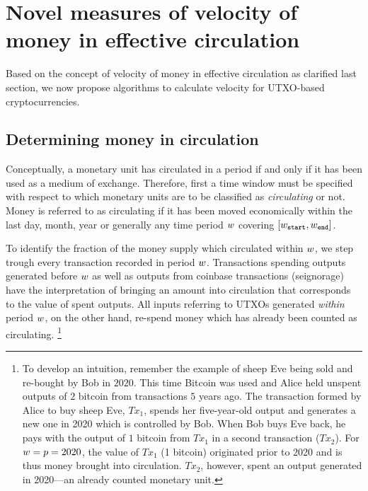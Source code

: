 
\section{Novel measures of velocity of money in effective circulation}
\label{sec:cc_money_seg}%

Based on the concept of velocity of money in effective circulation as
clarified last section, we now propose algorithms to calculate velocity for
UTXO-based cryptocurrencies. %

\subsection{Determining money in circulation}
\label{sec:cc_money_seg:sub:mcirc_concept}%

Conceptually, a monetary unit has circulated in a period if and only if it
has been used as a medium of exchange.  Therefore, first a time window must
be specified with respect to which monetary units are to be classified as
\emph{circulating} or not.  %
Money is referred to as circulating if it has been moved economically within
the last day, month, year or generally any time period ${w}$ covering
$[{w}_{\mathtt{start}} , {w}_{\mathtt{end}}]$. %

To identify the fraction of the money supply which circulated within ${w}$,
we step trough every transaction recorded in period ${w}$.  %
Transactions spending outputs generated before ${w}$ as well as outputs
from coinbase transactions (seignorage) have the interpretation of bringing
an amount into circulation that corresponds to the value of spent outputs.  %
All inputs referring to UTXOs generated \emph{within} period ${w}$, on the
other hand, re-spend money which has already been counted as circulating.%
\footnote{To develop an intuition, remember the example of sheep Eve being
  sold and re-bought by Bob in $2020$.  %
  This time Bitcoin was used and Alice held unspent outputs of $2$ bitcoin
  from transactions $5$ years ago.  %
  The transaction formed by Alice to buy sheep Eve, $Tx_1$, spends her
  five-year-old output and generates a new one in 2020 which is controlled by
  Bob.  %
  When Bob buys Eve back, he pays with the output of $1$ bitcoin from $Tx_1$
  in a second transaction ($Tx_2$).  %
  For ${w} = {p} = 2020$, the value of $Tx_1$ (1 bitcoin) originated
  prior to 2020 and is thus money brought into circulation.  %
  $Tx_2$, however, spent an output generated in 2020---an already counted
  monetary unit.  %
} %

